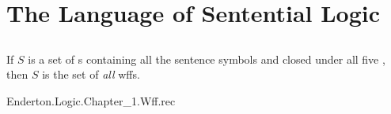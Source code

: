 \documentclass{report}
\begin{document}
\section{The Language of Sentential Logic}%

\subsection{}%

  \begin{theorem}
    If $S$ is a set of s containing all the
      sentence symbols and closed under all five
      , then $S$ is the set of
      \textit{all} wffs.
  \end{theorem}

    {Enderton.Logic.Chapter\_1.Wff.rec}
\end{document}
